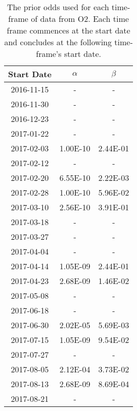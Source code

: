 \begin{table}
\centering
\caption[The prior odd]{The prior odds used for each time-frame of data from O2. Each time frame commences at the start date and concludes at the following time-frame's start date.
    }
\label{tab:priorodds}
\def\arraystretch{1.5} 
\setlength{\tabcolsep}{0.5em}
\begin{tabular}{c|cc}

Start Date & $\alpha$ &  $\beta$ \\
\midrule
2016-11-15 &        - &        - \\
2016-11-30 &        - &        - \\
2016-12-23 &        - &        - \\
2017-01-22 &        - &        - \\
2017-02-03 & 1.00E-10 & 2.44E-01 \\
2017-02-12 &        - &        - \\
2017-02-20 & 6.55E-10 & 2.22E-03 \\
2017-02-28 & 1.00E-10 & 5.96E-02 \\
2017-03-10 & 2.56E-10 & 3.91E-01 \\
2017-03-18 &        - &        - \\
2017-03-27 &        - &        - \\
2017-04-04 &        - &        - \\
2017-04-14 & 1.05E-09 & 2.44E-01 \\
2017-04-23 & 2.68E-09 & 1.46E-02 \\
2017-05-08 &        - &        - \\
2017-06-18 &        - &        - \\
2017-06-30 & 2.02E-05 & 5.69E-03 \\
2017-07-15 & 1.05E-09 & 9.54E-02 \\
2017-07-27 &        - &        - \\
2017-08-05 & 2.12E-04 & 3.73E-02 \\
2017-08-13 & 2.68E-09 & 8.69E-04 \\
2017-08-21 &        - &        - \\

\end{tabular}
\end{table}